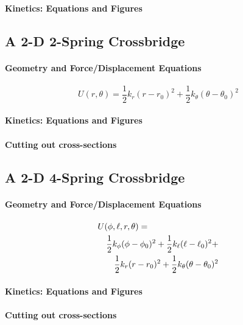 \documentclass[11pt]{article}
\begin{document}
\begin{multicols}{2}
\paragraph*{Kinetics: Equations and Figures}

\subsection*{A 2-D 2-Spring Crossbridge}

\paragraph*{Geometry and Force/Displacement Equations}

\begin{equation}
U(r,\theta)=\frac{1}{2}k_r (r-r_0)^2+\frac{1}{2}k_\theta (\theta-\theta_0)^2
\end{equation}

\paragraph*{Kinetics: Equations and Figures}

\paragraph*{Cutting out cross-sections}

\subsection*{A 2-D 4-Spring Crossbridge}
\paragraph*{Geometry and Force/Displacement Equations}
\begin{eqnarray}
	\lefteqn{U(\phi,\ell,r,\theta) = }  \nonumber \\
 	& & \frac{1}{2}k_\phi (\phi-\phi_0)^2 + \frac{1}{2}k_\ell (\ell-\ell_0)^2 + \nonumber \\
	& & \frac{1}{2}k_r (r-r_0)^2 + \frac{1}{2}k_\theta (\theta-\theta_0)^2
\end{eqnarray}

\paragraph*{Kinetics: Equations and Figures}
\paragraph*{Cutting out cross-sections}



\end{multicols}
\end{document}
